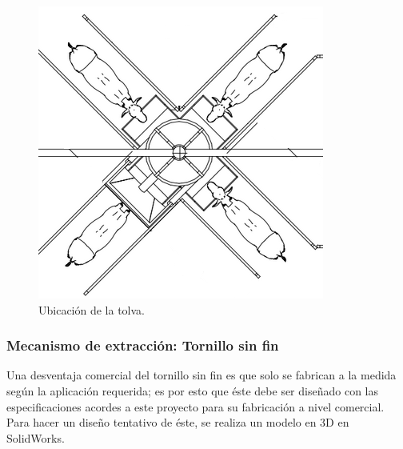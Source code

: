 \begin{figure}[H]
	\begin{center}
		\includegraphics[scale=0.50]{img/disenotolvas.png}
	\end{center}
	\caption{Ubicación de la tolva. \label{matrizmotorpng}}
\end{figure}




\subsubsection{Mecanismo de extracción: Tornillo sin fin}\label{disenotorni}

Una desventaja comercial del tornillo sin fin es que solo se fabrican a la medida según la aplicación requerida; es por esto que éste debe ser diseñado con las especificaciones acordes a este proyecto para su fabricación a nivel comercial. Para hacer un diseño tentativo de éste, se realiza un modelo en 3D en SolidWorks.

